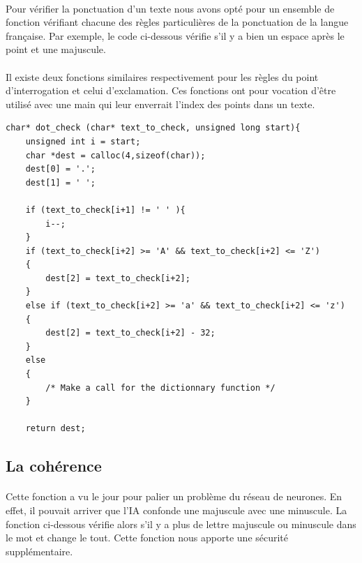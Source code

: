\documentclass{article}
\begin{document}
\paragraph{}
Pour vérifier la ponctuation d’un texte nous avons opté pour un ensemble de fonction vérifiant chacune des règles particulières de la ponctuation de la langue française. Par exemple, le code ci-dessous vérifie s'il y a bien un espace après le point et une majuscule.

\paragraph{}Il existe deux fonctions similaires respectivement pour les règles du point d’interrogation et celui d’exclamation. Ces fonctions ont pour vocation d'être utilisé avec une main qui leur enverrait l’index des points dans un texte.

\begin{lstlisting}
char* dot_check (char* text_to_check, unsigned long start){
    unsigned int i = start;
    char *dest = calloc(4,sizeof(char));
    dest[0] = '.';
    dest[1] = ' ';

    if (text_to_check[i+1] != ' ' ){
        i--;
    }
    if (text_to_check[i+2] >= 'A' && text_to_check[i+2] <= 'Z')
    {
        dest[2] = text_to_check[i+2];
    }
    else if (text_to_check[i+2] >= 'a' && text_to_check[i+2] <= 'z')
    {
        dest[2] = text_to_check[i+2] - 32;
    }
    else
    {
        /* Make a call for the dictionnary function */
    }

    return dest;
\end{lstlisting}

\subsection{La cohérence}
\paragraph{}Cette fonction a vu le jour pour palier un problème du réseau de neurones. En effet, il pouvait arriver que l'IA confonde une majuscule avec une minuscule. La fonction ci-dessous vérifie alors s’il y a plus de lettre majuscule ou minuscule dans le mot et change le tout.  Cette fonction nous apporte une sécurité supplémentaire.
\end{document}
